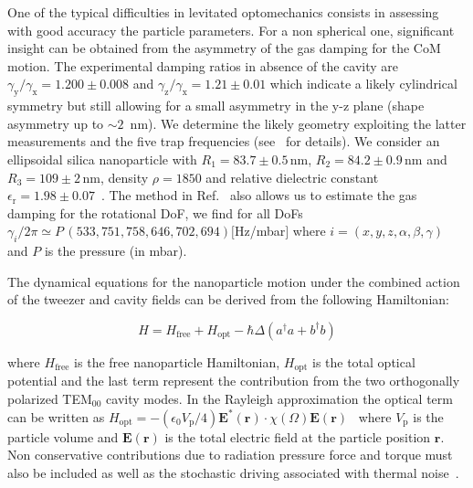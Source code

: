 \documentclass[aps,pra,twocolumn,nopacs,superscriptaddress,groupedaddress]{revtex4}
\begin{document}
One of the typical difficulties in levitated optomechanics consists in assessing with good accuracy the particle parameters. For a non spherical one, significant insight can be obtained from the asymmetry of the gas damping for the CoM motion. The experimental damping ratios in absence of the cavity are $\gamma_{\text{y}}/\gamma_{\text{x}}=1.200\pm0.008$ and $\gamma_{\text{z}}/\gamma_{\text{x}}=1.21\pm0.01$ which indicate a likely cylindrical symmetry but still allowing for a small asymmetry in the y-z plane (shape asymmetry up to $\sim2$\, nm). We determine the likely geometry exploiting the latter measurements and the five trap frequencies (see~\cite{supp} for details). We consider an ellipsoidal silica nanoparticle with $R_1=83.7\pm0.5$\,nm, $R_2=84.2\pm0.9$\,nm and $R_3=109\pm2$\,nm, density $\rho=1850$ and relative dielectric constant $\epsilon_{\text{r}}=1.98\pm0.07$~\cite{g2paper}. The method in Ref.~\cite{Cavalleri2010} also allows us to estimate the gas damping for the rotational DoF, we find for all DoFs $\gamma_i/2\pi\simeq P\,(533,751,758,646,702,694) [$Hz/mbar$]$ where $i=(x,y,z,\alpha,\beta,\gamma)$ and $P$ is the pressure (in mbar).


The dynamical equations for the nanoparticle motion under the combined action of the tweezer and cavity fields can be derived from the following Hamiltonian:

\begin{equation}
\label{eq1}
H=H_{\text{free}}+H_{\text{opt}}-\hbar \Delta (a^{\dag}a+b^{\dag}b)
\end{equation}

\noindent where $H_{\text{free}}$ is the free nanoparticle Hamiltonian, $H_{\text{opt}}$ is the total optical potential and the last term represent the contribution from the two orthogonally polarized TEM$_{\text{00}}$ cavity modes. In the Rayleigh approximation the optical term can be written as $H_{\text{opt}}=-(\epsilon_0 V_{\text{p}} /4) \mathbf{E}^*(\mathbf{r})\cdot\chi(\Omega)\mathbf{E}(\mathbf{r})$~\cite{elliptic_CS_pra} where $V_{\text{p}}$ is the particle volume and $\mathbf{E}(\mathbf{r})$ is the total electric field at the particle position $\mathbf{r}$. Non conservative contributions due to radiation pressure force and torque must also be included as well as the stochastic driving associated with thermal noise~\cite{rot_thermal_noise_1,rot_thermal_noise_2,rot_thermal_noise_3}.
\end{document}
